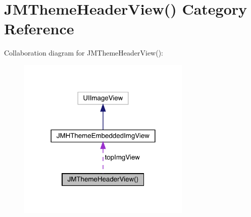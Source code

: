 \hypertarget{category_j_m_theme_header_view_07_08}{}\section{J\+M\+Theme\+Header\+View() Category Reference}
\label{category_j_m_theme_header_view_07_08}


Collaboration diagram for J\+M\+Theme\+Header\+View()\+:\nopagebreak
\begin{figure}[H]
\begin{center}
\leavevmode
\includegraphics[width=234pt]{category_j_m_theme_header_view_07_08__coll__graph}
\end{center}
\end{figure}

